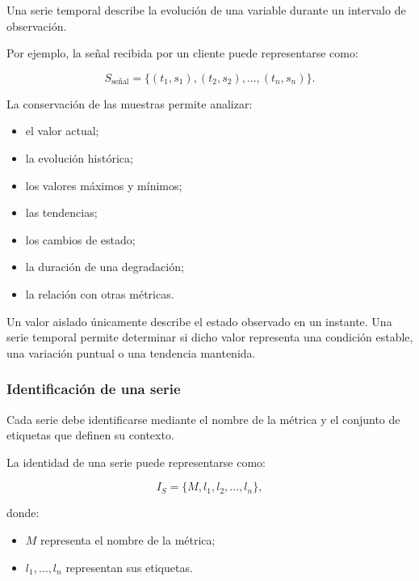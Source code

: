 Una serie temporal describe la evolución de una variable durante un
intervalo de observación.

Por ejemplo, la señal recibida por un cliente puede representarse como:

\[
    S_{\mathrm{señal}}
    =
    \{
        (t_1,s_1),
        (t_2,s_2),
        \ldots,
        (t_n,s_n)
    \}.
\]

La conservación de las muestras permite analizar:

\begin{itemize}
    \item el valor actual;

    \item la evolución histórica;

    \item los valores máximos y mínimos;

    \item las tendencias;

    \item los cambios de estado;

    \item la duración de una degradación;

    \item la relación con otras métricas.
\end{itemize}

Un valor aislado únicamente describe el estado observado en un instante.
Una serie temporal permite determinar si dicho valor representa una
condición estable, una variación puntual o una tendencia mantenida.


\subsubsection*{Identificación de una serie}

Cada serie debe identificarse mediante el nombre de la métrica y el
conjunto de etiquetas que definen su contexto.

La identidad de una serie puede representarse como:

\[
    I_S
    =
    \{
        M,
        l_1,
        l_2,
        \ldots,
        l_n
    \},
\]

donde:

\begin{itemize}
    \item \(M\) representa el nombre de la métrica;

    \item \(l_1,\ldots,l_n\) representan sus etiquetas.
\end{itemize}

